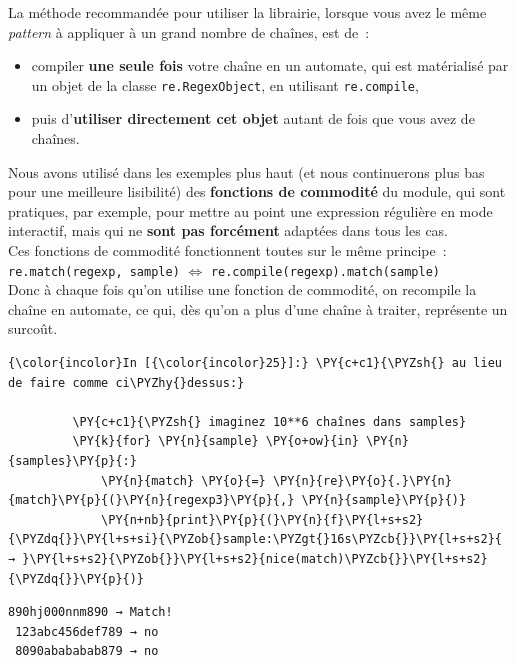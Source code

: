     La méthode recommandée pour utiliser la librairie, lorsque vous avez le
même \emph{pattern} à appliquer à un grand nombre de chaînes, est de~:

\begin{itemize}
	\item 
	compiler \textbf{une seule fois} votre chaîne en un automate, qui est
	matérialisé par un objet de la classe \texttt{re.RegexObject}, en
	utilisant \texttt{re.compile},
	\item
	puis d'\textbf{utiliser directement cet
	objet} autant de fois que vous avez de chaînes.
\end{itemize}

    Nous avons utilisé dans les exemples plus haut (et nous continuerons
plus bas pour une meilleure lisibilité) des \textbf{fonctions de
commodité} du module, qui sont pratiques, par exemple, pour mettre au
point une expression régulière en mode interactif, mais qui ne
\textbf{sont pas forcément} adaptées dans tous les cas.\\

Ces fonctions de commodité fonctionnent toutes sur le même principe~:\\

\texttt{re.match(regexp,\ sample)} \(\Longleftrightarrow\)
\texttt{re.compile(regexp).match(sample)}\\

Donc à chaque fois qu'on utilise une fonction de commodité, on recompile
la chaîne en automate, ce qui, dès qu'on a plus d'une chaîne à traiter,
représente un surcoût.

    \begin{Verbatim}[commandchars=\\\{\}]
{\color{incolor}In [{\color{incolor}25}]:} \PY{c+c1}{\PYZsh{} au lieu de faire comme ci\PYZhy{}dessus:}
         
         \PY{c+c1}{\PYZsh{} imaginez 10**6 chaînes dans samples}
         \PY{k}{for} \PY{n}{sample} \PY{o+ow}{in} \PY{n}{samples}\PY{p}{:}
             \PY{n}{match} \PY{o}{=} \PY{n}{re}\PY{o}{.}\PY{n}{match}\PY{p}{(}\PY{n}{regexp3}\PY{p}{,} \PY{n}{sample}\PY{p}{)}
             \PY{n+nb}{print}\PY{p}{(}\PY{n}{f}\PY{l+s+s2}{\PYZdq{}}\PY{l+s+si}{\PYZob{}sample:\PYZgt{}16s\PYZcb{}}\PY{l+s+s2}{ → }\PY{l+s+s2}{\PYZob{}}\PY{l+s+s2}{nice(match)\PYZcb{}}\PY{l+s+s2}{\PYZdq{}}\PY{p}{)}    
\end{Verbatim}


    \begin{Verbatim}[commandchars=\\\{\}]
  890hj000nnm890 → Match!
 123abc456def789 → no
 8090abababab879 → no

    \end{Verbatim}

